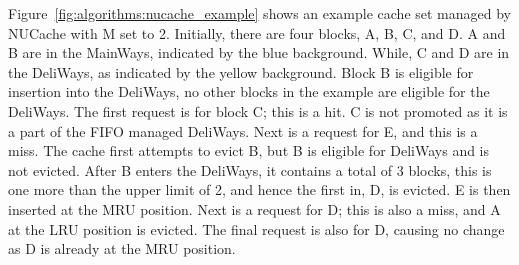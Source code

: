 Figure~\ref{fig:algorithms:nucache_example} shows an example cache set managed by NUCache with M set to 2.
Initially, there are four blocks, A, B, C, and D.
A and B are in the MainWays, indicated by the blue background.
While, C and D are in the DeliWays, as indicated by the yellow background.
Block B is eligible for insertion into the DeliWays, no other blocks in the example are eligible for the DeliWays.
The first request is for block C; this is a hit.
C is not promoted as it is a part of the FIFO managed DeliWays.
Next is a request for E, and this is a miss.
The cache first attempts to evict B, but B is eligible for DeliWays and is not evicted.
After B enters the DeliWays, it contains a total of 3 blocks, this is one more than the upper limit of 2, and hence the first in, D, is evicted.
E is then inserted at the MRU position.
Next is a request for D; this is also a miss, and A at the LRU position is evicted.
The final request is also for D, causing no change as D is already at the MRU position.

